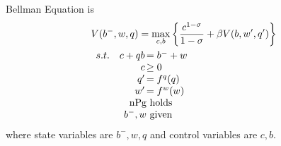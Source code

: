\documentclass{article}
\begin{document}
\begin{enumerate}
        Bellman Equation is
        \begin{align*}
            &V(b^{-},w,q)=\max_{c,b}\left\{\frac{c^{1-\sigma}}{1-\sigma}+\beta V(b,w',q')\right\}\\
            &\begin{array}{r@{\quad}r@{}l}
            s.t.&c+qb\,&=b^{-}+w\\
            &c\,&\ge0\\
            &q'\,&=f^q(q)\\
            &w'\,&=f^w(w)\\
            &\text{nPg}&\text{ holds}\\
            &b^{-},w &\text{ given}
            \end{array} 
        \end{align*}
        where state variables are $b^{-},w,q$ and control variables are $c,b$.
    \end{enumerate}
\end{document}
